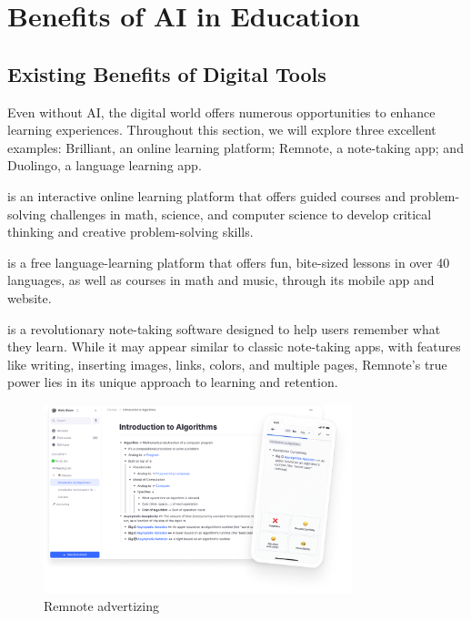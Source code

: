 \documentclass{article}
\begin{document}
\newpage


\section{Benefits of AI in Education}

\subsection{Existing Benefits of Digital Tools}

Even without AI, the digital world offers numerous opportunities
to enhance learning experiences. Throughout this section,
we will explore three excellent examples: Brilliant,
an online learning platform; Remnote, a note-taking app;
and Duolingo, a language learning app.

\cite[Brilliant]{brilliant} is an interactive online learning platform that
offers guided courses and problem-solving challenges
in math, science, and computer science to develop
critical thinking and creative problem-solving skills.

\cite[Duolingo]{duolingo} is a free language-learning platform
that offers fun, bite-sized lessons in over 40 languages,
as well as courses in math and music, through its mobile app and website.

\cite[Remnote]{remnote} is a revolutionary note-taking
software designed to help users remember what they learn.
While it may appear similar to classic note-taking apps,
with features like writing, inserting images, links, colors,
and multiple pages, Remnote's true power lies in its unique
approach to learning and retention.

\begin{figure}[h]
    \centering
    \includegraphics[width=0.8\textwidth]{./images/remnote_ad.png}
    \caption{Remnote advertizing \cite{remnote}}
\end{figure}
\end{document}
